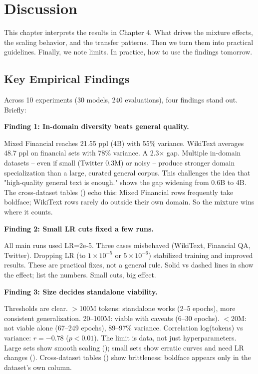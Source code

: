 \chapter{Discussion}

This chapter interprets the results in Chapter 4. What drives the mixture effects, the scaling behavior, and the transfer patterns. Then we turn them into practical guidelines. Finally, we note limits. In practice, how to use the findings tomorrow.

\section{Key Empirical Findings}

Across 10 experiments (30 models, 240 evaluations), four findings stand out. Briefly:

\textbf{Finding 1: In-domain diversity beats general quality.}

Mixed Financial reaches 21.55 ppl (4B) with 55\% variance. WikiText averages 48.7 ppl on financial sets with 78\% variance. A 2.3$\times$ gap. Multiple in-domain datasets -- even if small (Twitter 0.3M) or noisy -- produce stronger domain specialization than a large, curated general corpus. This challenges the idea that "high-quality general text is enough."  shows the gap widening from 0.6B to 4B. The cross-dataset tables () echo this: Mixed Financial rows frequently take boldface; WikiText rows rarely do outside their own domain. So the mixture wins where it counts.

\textbf{Finding 2: Small LR cuts fixed a few runs.}

All main runs used LR=2e-5. Three cases misbehaved (WikiText, Financial QA, Twitter). Dropping LR (to $1\times10^{-5}$ or $5\times10^{-6}$) stabilized training and improved results. These are practical fixes, not a general rule. Solid vs dashed lines in  show the effect;  list the numbers. Small cuts, big effect.

\textbf{Finding 3: Size decides standalone viability.}

Thresholds are clear. $>$100M tokens: standalone works (2–5 epochs), more consistent generalization. 20–100M: viable with caveats (6–30 epochs). $<$20M: not viable alone (67–249 epochs), 89–97\% variance. Correlation log(tokens) vs variance: $r = -0.78$ ($p < 0.01$). The limit is data, not just hyperparameters. Large sets show smooth scaling (); small sets show erratic curves and need LR changes (). Cross‑dataset tables () show brittleness: boldface appears only in the dataset’s own column.

